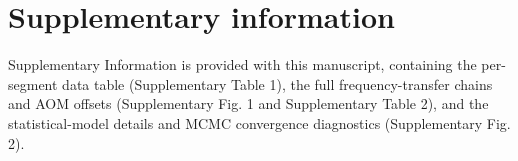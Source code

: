 \documentclass[11pt,a4paper]{article}
\begin{document}
\section*{Supplementary information}
Supplementary Information is provided with this manuscript, containing the
per-segment data table (Supplementary Table 1), the full frequency-transfer
chains and AOM offsets (Supplementary Fig. 1 and Supplementary Table 2),
and the statistical-model details and MCMC convergence diagnostics
(Supplementary Fig. 2).




\end{document}
